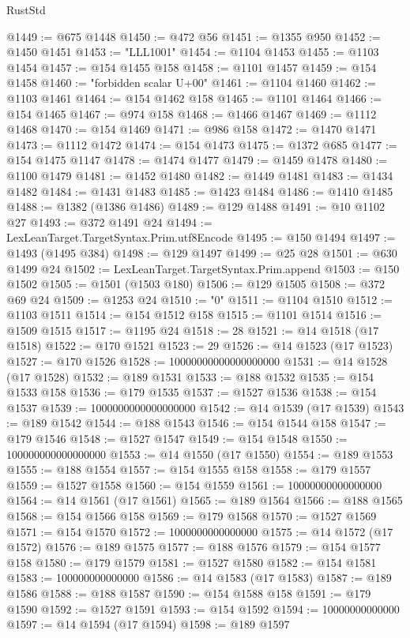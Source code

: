 \begin{lexlean}{RustStd}
\begin{coremodule}
{\begin{coremodule}
{{{{{{{{{{{{{{{{{{{{{{{{{{{{{{{{{{{{{{{@1449 := @675 @1448
@1450 := @472 @56
@1451 := @1355 @950
@1452 := @1450 @1451
@1453 := "LLL1001"
@1454 := @1104 @1453
@1455 := @1103 @1454
@1457 := @154 @1455 @158
@1458 := @1101 @1457
@1459 := @154 @1458
@1460 := "forbidden scalar U+00"
@1461 := @1104 @1460
@1462 := @1103 @1461
@1464 := @154 @1462 @158
@1465 := @1101 @1464
@1466 := @154 @1465
@1467 := @974 @158
@1468 := @1466 @1467
@1469 := @1112 @1468
@1470 := @154 @1469
@1471 := @986 @158
@1472 := @1470 @1471
@1473 := @1112 @1472
@1474 := @154 @1473
@1475 := @1372 @685
@1477 := @154 @1475 @1147
@1478 := @1474 @1477
@1479 := @1459 @1478
@1480 := @1100 @1479
@1481 := @1452 @1480
@1482 := @1449 @1481
@1483 := @1434 @1482
@1484 := @1431 @1483
@1485 := @1423 @1484
@1486 := @1410 @1485
@1488 := @1382 (@1386 @1486)
@1489 := @129 @1488
@1491 := @10 @1102 @27
@1493 := @372 @1491 @24
@1494 := LexLeanTarget.TargetSyntax.Prim.utf8Encode
@1495 := @150 @1494
@1497 := @1493 (@1495 @384)
@1498 := @129 @1497
@1499 := @25 @28
@1501 := @630 @1499 @24
@1502 := LexLeanTarget.TargetSyntax.Prim.append
@1503 := @150 @1502
@1505 := @1501 (@1503 @180)
@1506 := @129 @1505
@1508 := @372 @69 @24
@1509 := @1253 @24
@1510 := "0"
@1511 := @1104 @1510
@1512 := @1103 @1511
@1514 := @154 @1512 @158
@1515 := @1101 @1514
@1516 := @1509 @1515
@1517 := @1195 @24
@1518 := 28
@1521 := @14 @1518 (@17 @1518)
@1522 := @170 @1521
@1523 := 29
@1526 := @14 @1523 (@17 @1523)
@1527 := @170 @1526
@1528 := 10000000000000000000
@1531 := @14 @1528 (@17 @1528)
@1532 := @189 @1531
@1533 := @188 @1532
@1535 := @154 @1533 @158
@1536 := @179 @1535
@1537 := @1527 @1536
@1538 := @154 @1537
@1539 := 1000000000000000000
@1542 := @14 @1539 (@17 @1539)
@1543 := @189 @1542
@1544 := @188 @1543
@1546 := @154 @1544 @158
@1547 := @179 @1546
@1548 := @1527 @1547
@1549 := @154 @1548
@1550 := 100000000000000000
@1553 := @14 @1550 (@17 @1550)
@1554 := @189 @1553
@1555 := @188 @1554
@1557 := @154 @1555 @158
@1558 := @179 @1557
@1559 := @1527 @1558
@1560 := @154 @1559
@1561 := 10000000000000000
@1564 := @14 @1561 (@17 @1561)
@1565 := @189 @1564
@1566 := @188 @1565
@1568 := @154 @1566 @158
@1569 := @179 @1568
@1570 := @1527 @1569
@1571 := @154 @1570
@1572 := 1000000000000000
@1575 := @14 @1572 (@17 @1572)
@1576 := @189 @1575
@1577 := @188 @1576
@1579 := @154 @1577 @158
@1580 := @179 @1579
@1581 := @1527 @1580
@1582 := @154 @1581
@1583 := 100000000000000
@1586 := @14 @1583 (@17 @1583)
@1587 := @189 @1586
@1588 := @188 @1587
@1590 := @154 @1588 @158
@1591 := @179 @1590
@1592 := @1527 @1591
@1593 := @154 @1592
@1594 := 10000000000000
@1597 := @14 @1594 (@17 @1594)
@1598 := @189 @1597
}}}}}}}}}}}}}}}}}}}}}}}}}}}}}}}}}}}}}}}
\end{coremodule}}
\end{coremodule}
\end{lexlean}
